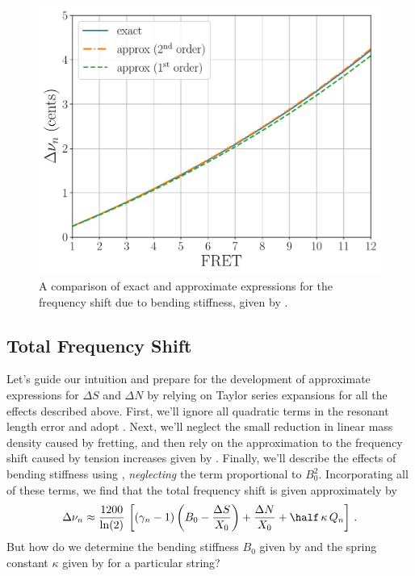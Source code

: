 \begin{figure}
  \centering
  \includegraphics[width=5.0in]{figures/bnu_test}
  \caption{\label{fig:bnu_test} A comparison of exact and approximate expressions for the frequency shift due to bending stiffness, given by .}
\end{figure}

\subsection{Total Frequency Shift\label{sct:tot_freq_shift}}

Let's guide our intuition and prepare for the development of approximate expressions for $\Delta S$ and $\Delta N$ by relying on Taylor series expansions for all the effects described above. First, we'll ignore all quadratic terms in the resonant length error and adopt . Next, we'll neglect the small reduction in linear mass density caused by fretting, and then rely on the approximation to the frequency shift caused by tension increases given by . Finally, we'll describe the effects of bending stiffness using , \emph{neglecting} the term proportional to $B_0^2$. Incorporating all of these terms, we find that the total frequency shift is given approximately by
\begin{equation}\label{eqn:error_tot}
  \Delta \nu_n \approx \frac{1200}{\ln(2)}\, \left[ \left(\gamma_n - 1\right) \left(B_0 - \frac{\Delta S}{X_0}\right) + \frac{\Delta N}{X_0} + \half\, \kappa\, Q_n \right]\, .
\end{equation}
But how do we determine the bending stiffness $B_0$ given by  and the spring constant $\kappa$ given by  for a particular string?

